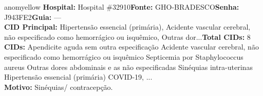 \documentclass[a4paper,10pt]{article}
\begin{document}
\begin{anomalycard}[Interna\c{c}\~{a}o \#118632 | Pac. \#98420 | MODERADO (z=2.83) | LOS: 2d | 24/02/2026\,$\to$\,26/02/2026]{anomyellow}
\textbf{Hospital:} Hospital \#32910\quad \textbf{Fonte:} GHO-BRADESCO\quad \textbf{Senha:} J943FE2\quad \textbf{Guia:} ---\\

\textbf{CID Principal:} {\small Hipertensão essencial (primária), Acidente vascular cerebral, não especificado como hemorrágico ou isquêmico, Outras dor...}\quad\textbf{Total CIDs:} 8\\

\textbf{CIDs:} {\scriptsize Apendicite aguda sem outra especificação \textbar{} Acidente vascular cerebral, não especificado como hemorrágico ou isquêmico \textbar{} Septicemia por Staphylococcus aureus \textbar{} Outras dores abdominais e as não especificadas \textbar{} Sinéquias intra-uterinas \textbar{} Hipertensão essencial (primária) \textbar{} COVID-19, ...}\\

\textbf{Motivo:} {\scriptsize Sinéquias/ contracepção.}\\




\end{anomalycard}
\end{document}
